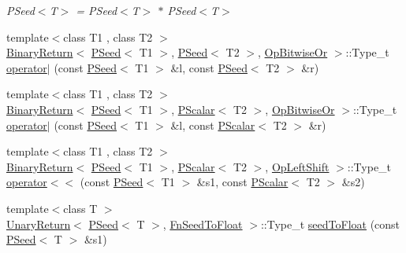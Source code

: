 \begin{DoxyCompactItemize}
\begin{DoxyCompactList}\small\item\em P\+Seed$<$\+T$>$ = P\+Seed$<$\+T$>$ $\ast$ P\+Seed$<$\+T$>$ \end{DoxyCompactList}\item 
{\footnotesize template$<$class T1 , class T2 $>$ }\\\mbox{\hyperlink{structENSEM_1_1BinaryReturn}{Binary\+Return}}$<$ \mbox{\hyperlink{classENSEM_1_1PSeed}{P\+Seed}}$<$ T1 $>$, \mbox{\hyperlink{classENSEM_1_1PSeed}{P\+Seed}}$<$ T2 $>$, \mbox{\hyperlink{structENSEM_1_1OpBitwiseOr}{Op\+Bitwise\+Or}} $>$\+::Type\+\_\+t \mbox{\hyperlink{group__primseed_gafffac24485a71eb45df5a8073ab12746}{operator$\vert$}} (const \mbox{\hyperlink{classENSEM_1_1PSeed}{P\+Seed}}$<$ T1 $>$ \&l, const \mbox{\hyperlink{classENSEM_1_1PSeed}{P\+Seed}}$<$ T2 $>$ \&r)
\item 
{\footnotesize template$<$class T1 , class T2 $>$ }\\\mbox{\hyperlink{structENSEM_1_1BinaryReturn}{Binary\+Return}}$<$ \mbox{\hyperlink{classENSEM_1_1PSeed}{P\+Seed}}$<$ T1 $>$, \mbox{\hyperlink{classENSEM_1_1PScalar}{P\+Scalar}}$<$ T2 $>$, \mbox{\hyperlink{structENSEM_1_1OpBitwiseOr}{Op\+Bitwise\+Or}} $>$\+::Type\+\_\+t \mbox{\hyperlink{group__primseed_ga65b26c68c77d19a64ae5896efce8b37c}{operator$\vert$}} (const \mbox{\hyperlink{classENSEM_1_1PSeed}{P\+Seed}}$<$ T1 $>$ \&l, const \mbox{\hyperlink{classENSEM_1_1PScalar}{P\+Scalar}}$<$ T2 $>$ \&r)
\item 
{\footnotesize template$<$class T1 , class T2 $>$ }\\\mbox{\hyperlink{structENSEM_1_1BinaryReturn}{Binary\+Return}}$<$ \mbox{\hyperlink{classENSEM_1_1PSeed}{P\+Seed}}$<$ T1 $>$, \mbox{\hyperlink{classENSEM_1_1PScalar}{P\+Scalar}}$<$ T2 $>$, \mbox{\hyperlink{structENSEM_1_1OpLeftShift}{Op\+Left\+Shift}} $>$\+::Type\+\_\+t \mbox{\hyperlink{group__primseed_ga2c9462b410a1897e81847c2ca630c0fd}{operator$<$$<$}} (const \mbox{\hyperlink{classENSEM_1_1PSeed}{P\+Seed}}$<$ T1 $>$ \&s1, const \mbox{\hyperlink{classENSEM_1_1PScalar}{P\+Scalar}}$<$ T2 $>$ \&s2)
\item 
{\footnotesize template$<$class T $>$ }\\\mbox{\hyperlink{structENSEM_1_1UnaryReturn}{Unary\+Return}}$<$ \mbox{\hyperlink{classENSEM_1_1PSeed}{P\+Seed}}$<$ T $>$, \mbox{\hyperlink{structENSEM_1_1FnSeedToFloat}{Fn\+Seed\+To\+Float}} $>$\+::Type\+\_\+t \mbox{\hyperlink{group__primseed_gace5eb402052ee22e28bfd72ab7e92194}{seed\+To\+Float}} (const \mbox{\hyperlink{classENSEM_1_1PSeed}{P\+Seed}}$<$ T $>$ \&s1)

\end{DoxyCompactItemize}
